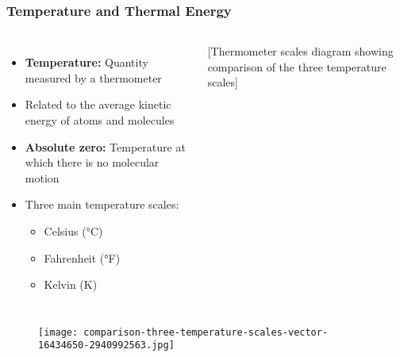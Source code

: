 \documentclass{beamer}
\begin{document}
\begin{frame}
    \frametitle{Temperature and Thermal Energy}
    \begin{columns}
        \begin{itemize}
            \item \textbf{Temperature:} Quantity measured by a thermometer
            \item Related to the average kinetic energy of atoms and molecules
            \item \textbf{Absolute zero:} Temperature at which there is no molecular motion
            \item Three main temperature scales:
            \begin{itemize}
                \item Celsius (°C)
                \item Fahrenheit (°F)
                \item Kelvin (K)
            \end{itemize}
        \end{itemize}
        
        \begin{center}
            \alert{[Thermometer scales diagram showing comparison of the three temperature scales]}
        \end{center}
    \end{columns}
\end{frame}

\begin{frame}

\begin{figure}
    \centering
    \texttt{[image: comparison-three-temperature-scales-vector-16434650-2940992563.jpg]}
\end{figure}
\end{frame}
\end{document}
